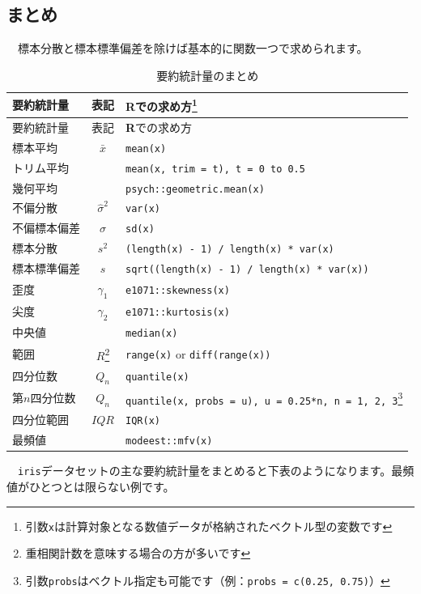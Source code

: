 \documentclass[
  12pt,
]{book}
\begin{document}
\newpage

\hypertarget{ux307eux3068ux3081-1}{%
\subsection{まとめ}\label{ux307eux3068ux3081-1}}

　標本分散と標本標準偏差を除けば基本的に関数一つで求められます。

\begin{longtable}[]{@{}lcl@{}}
\caption{要約統計量のまとめ}\tabularnewline
\toprule
要約統計量 & 表記 & \textbf{R}での求め方\footnote{引数\texttt{x}は計算対象となる数値データが格納されたベクトル型の変数です} \\
\midrule
\endfirsthead
\toprule
要約統計量 & 表記 & \textbf{R}での求め方{} \\
\midrule
\endhead
標本平均 & \(\bar{x}\) & \texttt{mean(x)} \\
トリム平均 & & \texttt{mean(x,\ trim\ =\ t),\ t\ =\ 0\ to\ 0.5} \\
幾何平均 & & \texttt{psych::geometric.mean(x)} \\
不偏分散 & \(\hat{\sigma}^2\) & \texttt{var(x)} \\
不偏標本偏差 & \(\hat{\sigma}\) & \texttt{sd(x)} \\
標本分散 & \(s^2\) & \texttt{(length(x)\ -\ 1)\ /\ length(x)\ *\ var(x)} \\
標本標準偏差 & \(s\) & \texttt{sqrt((length(x)\ -\ 1)\ /\ length(x)\ *\ var(x))} \\
歪度 & \(\gamma_1\) & \texttt{e1071::skewness(x)} \\
尖度 & \(\gamma_2\) & \texttt{e1071::kurtosis(x)} \\
中央値 & & \texttt{median(x)} \\
範囲 & \(R\)\footnote{重相関計数を意味する場合の方が多いです} & \texttt{range(x)} or \texttt{diff(range(x))} \\
四分位数 & \(Q_n\) & \texttt{quantile(x)} \\
第\(n\)四分位数 & \(Q_n\) & \texttt{quantile(x,\ probs\ =\ u),\ u\ =\ 0.25*n,\ n\ =\ 1,\ 2,\ 3}\footnote{引数\texttt{probs}はベクトル指定も可能です（例：\texttt{probs\ =\ c(0.25,\ 0.75)}）} \\
四分位範囲 & \(IQR\) & \texttt{IQR(x)} \\
最頻値 & & \texttt{modeest::mfv(x)} \\
\bottomrule
\end{longtable}

　\texttt{iris}データセットの主な要約統計量をまとめると下表のようになります。最頻値がひとつとは限らない例です。
\end{document}
